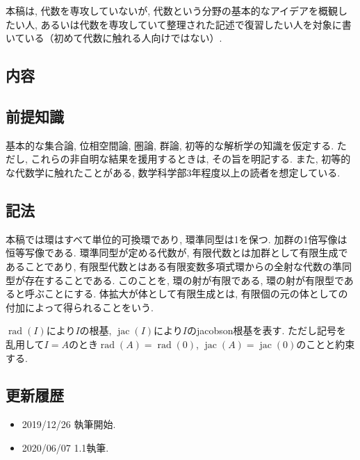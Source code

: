 \documentclass[a4paper, twoside]{bxjsarticle}
\DeclareMathOperator{\rad}{rad}
\DeclareMathOperator{\jac}{jac}
\theoremstyle{definition}
\begin{document}
        本稿は, 代数を専攻していないが, 代数という分野の基本的なアイデアを概観したい人, あるいは代数を専攻していて整理された記述で復習したい人を対象に書いている（初めて代数に触れる人向けではない）. 

        \subsection*{内容}


        \subsection*{前提知識}
        基本的な集合論, 位相空間論, 圏論, 群論, 初等的な解析学の知識を仮定する. ただし, これらの非自明な結果を援用するときは, その旨を明記する. また, 初等的な代数学に触れたことがある, 数学科学部3年程度以上の読者を想定している. 
        
        \subsection*{記法}
        本稿では環はすべて単位的可換環であり, 環準同型は1を保つ. 加群の1倍写像は恒等写像である. 環準同型が定める代数が, 有限代数とは加群として有限生成であることであり, 有限型代数とはある有限変数多項式環からの全射な代数の準同型が存在することである. このことを, 環の射が有限である, 環の射が有限型であると呼ぶことにする. 体拡大が体として有限生成とは, 有限個の元の体としての付加によって得られることをいう. 

        $\rad(I)$により$I$の根基, $\jac(I)$により$I$のjacobson根基を表す. ただし記号を乱用して$I=A$のとき$\rad(A)=\rad(0)$, $\jac(A)=\jac(0)$のことと約束する.


        \subsection*{更新履歴}
        \begin{itemize}
            \item 2019/12/26 執筆開始.
            \item 2020/06/07 1.1執筆.
        \end{itemize}
        
    \newpage
    \tableofcontents

    \cleardoublepage
  
\end{document}
